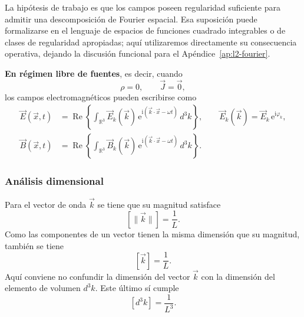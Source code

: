 \documentclass[12pt,a4paper]{article}
\theoremstyle{definition}
\theoremstyle{plain}
\numberwithin{equation}{section}
\theoremstyle{remark}
\newcommand{\ii}{\mathrm{i}}
\newcommand{\ee}{\mathrm{e}}
\begin{document}
La hipótesis de trabajo es que los campos poseen regularidad suficiente para admitir una descomposición de Fourier espacial. Esa suposición puede formalizarse en el lenguaje de espacios de funciones cuadrado integrables o de clases de regularidad apropiadas; aquí utilizaremos directamente su consecuencia operativa, dejando la discusión funcional para el Apéndice~\ref{ap:l2-fourier}.

\textbf{En régimen libre de fuentes}, es decir, cuando
\begin{equation*}
    \rho=0,
    \qquad
    \vec J=\vec 0,
\end{equation*}
los campos electromagnéticos pueden escribirse como
\begin{align}
    \vec E(\vec x,t)&=\operatorname{Re}\left\{
        \int_{\mathbb R^3}\vec E_k(\vec k)\,\ee^{\ii(\vec k\cdot\vec x-\omega t)}\,d^3k
    \right\},
    \qquad
    \vec E_k(\vec k)=\vec E_k\,\ee^{\ii\varphi_k},
    \label{eq:campo-E-espectral}\\
    \vec B(\vec x,t)&=\operatorname{Re}\left\{
        \int_{\mathbb R^3}\vec B_k(\vec k)\,\ee^{\ii(\vec k\cdot\vec x-\omega t)}\,d^3k
    \right\}.
    \label{eq:campo-B-espectral}
\end{align}

\subsubsection{Análisis dimensional}

Para el vector de onda $\vec k$ se tiene que su magnitud satisface
\begin{equation*}
    \left[\|\vec k\|\right]=\frac{1}{L}.
\end{equation*}
Como las componentes de un vector tienen la misma dimensión que su magnitud, también se tiene
\begin{equation*}
    \left[\vec k\right]=\frac{1}{L}.
\end{equation*}
Aquí conviene no confundir la dimensión del vector $\vec k$ con la dimensión del elemento de volumen $d^3k$. Este último sí cumple
\begin{equation*}
    \left[d^3k\right]=\frac{1}{L^3}.
\end{equation*}
\end{document}
